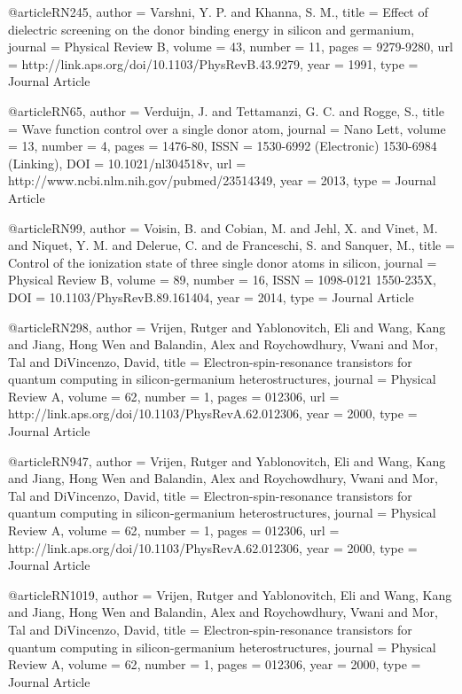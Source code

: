 @article{RN245,
   author = {Varshni, Y. P. and Khanna, S. M.},
   title = {Effect of dielectric screening on the donor binding energy in silicon and germanium},
   journal = {Physical Review B},
   volume = {43},
   number = {11},
   pages = {9279-9280},
   url = {http://link.aps.org/doi/10.1103/PhysRevB.43.9279},
   year = {1991},
   type = {Journal Article}
}

@article{RN65,
   author = {Verduijn, J. and Tettamanzi, G. C. and Rogge, S.},
   title = {Wave function control over a single donor atom},
   journal = {Nano Lett},
   volume = {13},
   number = {4},
   pages = {1476-80},
   ISSN = {1530-6992 (Electronic)
1530-6984 (Linking)},
   DOI = {10.1021/nl304518v},
   url = {http://www.ncbi.nlm.nih.gov/pubmed/23514349},
   year = {2013},
   type = {Journal Article}
}

@article{RN99,
   author = {Voisin, B. and Cobian, M. and Jehl, X. and Vinet, M. and Niquet, Y. M. and Delerue, C. and de Franceschi, S. and Sanquer, M.},
   title = {Control of the ionization state of three single donor atoms in silicon},
   journal = {Physical Review B},
   volume = {89},
   number = {16},
   ISSN = {1098-0121
1550-235X},
   DOI = {10.1103/PhysRevB.89.161404},
   year = {2014},
   type = {Journal Article}
}

@article{RN298,
   author = {Vrijen, Rutger and Yablonovitch, Eli and Wang, Kang and Jiang, Hong Wen and Balandin, Alex and Roychowdhury, Vwani and Mor, Tal and DiVincenzo, David},
   title = {Electron-spin-resonance transistors for quantum computing in silicon-germanium heterostructures},
   journal = {Physical Review A},
   volume = {62},
   number = {1},
   pages = {012306},
   url = {http://link.aps.org/doi/10.1103/PhysRevA.62.012306},
   year = {2000},
   type = {Journal Article}
}

@article{RN947,
   author = {Vrijen, Rutger and Yablonovitch, Eli and Wang, Kang and Jiang, Hong Wen and Balandin, Alex and Roychowdhury, Vwani and Mor, Tal and DiVincenzo, David},
   title = {Electron-spin-resonance transistors for quantum computing in silicon-germanium heterostructures},
   journal = {Physical Review A},
   volume = {62},
   number = {1},
   pages = {012306},
   url = {http://link.aps.org/doi/10.1103/PhysRevA.62.012306},
   year = {2000},
   type = {Journal Article}
}

@article{RN1019,
   author = {Vrijen, Rutger and Yablonovitch, Eli and Wang, Kang and Jiang, Hong Wen and Balandin, Alex and Roychowdhury, Vwani and Mor, Tal and DiVincenzo, David},
   title = {Electron-spin-resonance transistors for quantum computing in silicon-germanium heterostructures},
   journal = {Physical Review A},
   volume = {62},
   number = {1},
   pages = {012306},
   year = {2000},
   type = {Journal Article}
}

